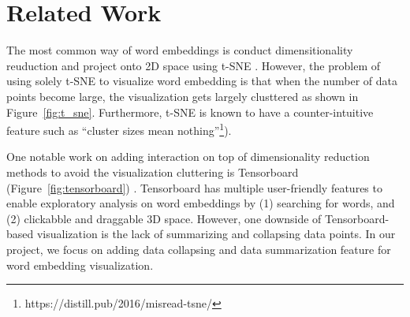 \section{Related Work}
The most common way of word embeddings is conduct dimensitionality reuduction and project onto 2D space using t-SNE \cite{t-sne}. 
However, the problem of using solely t-SNE to visualize word embedding is that when the number of data points become large, the visualization gets largely clusttered as shown in Figure~\ref{fig:t_sne}. 
Furthermore, t-SNE is known to have a counter-intuitive feature such as ``cluster sizes mean nothing''\footnote{https://distill.pub/2016/misread-tsne/}).

One notable work on adding interaction on top of dimensionality reduction methods to avoid the visualization cluttering is Tensorboard (Figure~\ref{fig:tensorboard}) \cite{tensorboard_viz}. 
Tensorboard has multiple user-friendly features to enable exploratory analysis on word embeddings by (1) searching for words, and (2) clickabble and draggable 3D space. 
However, one downside of Tensorboard-based visualization is the lack of summarizing and collapsing data points. 
In our project, we focus on adding data collapsing and data summarization feature for word embedding visualization. 
